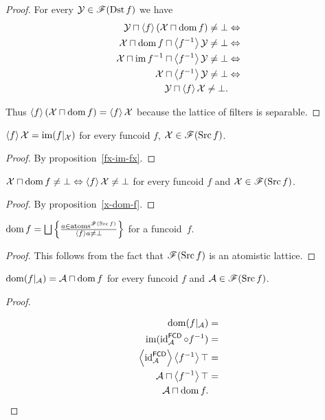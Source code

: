 \begin{proof}
For every $\mathcal{Y}\in\mathscr{F}(\operatorname{Dst} f)$ we have
\begin{align*}
\mathcal{Y}\sqcap\left\langle f\right\rangle(\mathcal{X}\sqcap\operatorname{dom} f)\ne\bot
& \Leftrightarrow\\
\mathcal{X}\sqcap\operatorname{dom} f\sqcap\left\langle f^{-1}\right\rangle\mathcal{Y}\ne\bot & \Leftrightarrow\\
\mathcal{X}\sqcap\operatorname{im}
f^{-1}\sqcap\left\langle f^{-1}\right\rangle\mathcal{Y}\ne\bot &
\Leftrightarrow\\
\mathcal{X}\sqcap\left\langle f^{-1}\right\rangle\mathcal{Y}\ne\bot &
\Leftrightarrow\\
\mathcal{Y}\sqcap\left\langle f\right\rangle\mathcal{X}\ne\bot.
\end{align*}


Thus $\left\langle f\right\rangle(\mathcal{X}\sqcap\operatorname{dom} f)=\left\langle f\right\rangle\mathcal{X}$ because
the lattice of filters is separable.\end{proof}
\begin{prop}
$\left\langle f\right\rangle\mathcal{X}=\operatorname{im}(f|_{\mathcal{X}})$ for every funcoid $f$,
$\mathcal{X}\in\mathscr{F}(\operatorname{Src} f)$.\end{prop}

\begin{proof}
By proposition~\ref{fx-im-fx}.
\end{proof}

\begin{prop}\label{x-dom-fcd}
$\mathcal{X}\sqcap\operatorname{dom} f\ne\bot\Leftrightarrow\left\langle f\right\rangle\mathcal{X}\ne\bot$
for every funcoid $f$ and $\mathcal{X}\in\mathscr{F}(\operatorname{Src} f)$.
\end{prop}

\begin{proof}
By proposition~\ref{x-dom-f}.
\end{proof}

\begin{cor}\label{dom-fcd-at}
$\dom f=\bigsqcup\setcond{a\in\atoms^{\mathscr{F}(\Src f)}}{\supfun
fa\ne\bot}$ for a funcoid~$f$.
\end{cor}
\begin{proof}
This follows from the fact that $\mathscr{F}(\operatorname{Src} f)$ is an atomistic
lattice.\end{proof}
\begin{prop}
$\operatorname{dom}(f|_{\mathcal{A}})=\mathcal{A}\sqcap\operatorname{dom} f$ for every funcoid
$f$ and $\mathcal{A}\in\mathscr{F}(\operatorname{Src} f)$.\end{prop}
\begin{proof}
~

\begin{align*}
\operatorname{dom}(f|_{\mathcal{A}}) & =\\
\operatorname{im}(\operatorname{id}_{\mathcal{A}}^{\mathsf{FCD}}\circ f^{-1}) & =\\
\left\langle \operatorname{id}_{\mathcal{A}}^{\mathsf{FCD}}\right\rangle\left\langle f^{-1}\right\rangle\top & =\\
\mathcal{A}\sqcap\left\langle f^{-1}\right\rangle\top & =\\
\mathcal{A}\sqcap\operatorname{dom} f.
\end{align*}
\end{proof}

